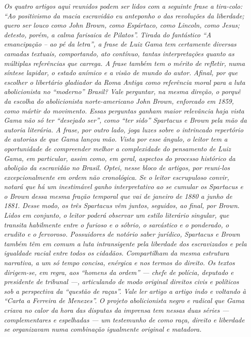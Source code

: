 \begin{didas}
\emph{Os quatro artigos aqui reunidos podem ser lidos com a seguinte
frase a tira-colo: ``Ao positivismo da macia escravidão eu anteponho o
das revoluções da liberdade; quero ser louco como John Brown, como
Espártaco, como Lincoln, como Jesus; detesto, porém, a calma farisaica
de Pilatos''. Tirada do fantástico ``A emancipação -- ao pé da
letra'', a frase de Luiz Gama tem certamente diversas camadas
textuais, comportando, ato contínuo, tantas interpretações quanto as
múltiplas referências que carrega. A frase também tem o mérito de
refletir, numa síntese lapidar, o estado anímico e a visão de mundo do
autor. Afinal, por que escolher o libertário gladiador da Roma Antiga
como referência moral para a luta abolicionista no ``moderno'' Brasil?
Vale perguntar, na mesma direção, o porquê da escolha do abolicionista
norte-americano John Brown, enforcado em 1859, como mártir do movimento.
Essas perguntas ganham maior relevância haja vista Gama não só ter
``desejado ser'', como ``ter sido'' Spartacus e Brown pela mão da autoria
literária. A frase, por outro lado, joga luzes sobre o intrincado
repertório de autorias de que Gama lançou mão. Vista por esse ângulo, o
leitor tem a oportunidade de compreender melhor a complexidade do
pensamento de Luiz Gama, em particular, assim como, em geral, aspectos
do  processo histórico da abolição da escravidão no Brasil. Optei, nesse
bloco de artigos, por reuni-los excepcionalmente em ordem não
cronológica. Se o leitor escrupuloso convir, notará que há um
inestimável ganho interpretativo ao se cumular os Spartacus e o
Brown dessa mesma fração temporal que vai de janeiro de 1880 a
junho de 1881. Desse modo, os três Spartacus vêm juntos,
seguidos, ao final, por Brown. Lidos em conjunto, o leitor poderá
observar um estilo literário singular, que transita habilmente entre o
furioso e o sóbrio, o sarcástico e o ponderado, o erudito e o fervoroso.
Possuidores de notório saber jurídico, Spartacus e Brown
também têm em comum a luta intransigente pela liberdade dos
escravizados e pela igualdade racial entre todos os cidadãos.
Compartilham da mesma estrutura narrativa, a um só tempo concisa,
enérgica e nos termos do direito. Os textos dirigem-se, em regra, aos
``homens da ordem'' --- chefe de polícia, deputado e presidente de tribunal
---, articulando de modo original direitos civis e políticos sob a
perspectiva da ``questão de raças''. Vale ler artigo a artigo indo e
voltando à ``Carta a Ferreira de Menezes''. O projeto abolicionista negro e
radical que Gama criava no calor da hora das disputas da imprensa tem
nessas duas séries --- complementares e espelhadas --- um testemunho de
como raça, direito e liberdade se organizavam numa combinação igualmente
original e matadora.}
\end{didas}

